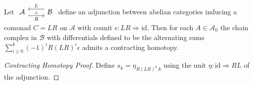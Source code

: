 \begin{lem}[label=lem:contractHomotop]
    Let $\begin{tikzcd}
{\mathcal{A}} & {\mathcal{B}}
\arrow[""{name=0, anchor=center, inner sep=0}, "R"', shift right=2, from=1-1, to=1-2]
\arrow[""{name=1, anchor=center, inner sep=0}, "L"', shift right=2, from=1-2, to=1-1]
\arrow["\dashv"{anchor=center, rotate=-90}, draw=none, from=1, to=0]
\end{tikzcd}$ define an adjunction between abelian categories inducing a comonad $C = LR$ on $\mathcal{A}$ with counit $\epsilon:LR\Rightarrow \text{id}$. Then for each $A \in \mathcal{A}_0$ the chain complex in $\mathcal{B}$ with differentials defined to be the alternating sums $\sum_{i\geq 0}^k(-1)^iR(LR)^i\epsilon$ admits a contracting homotopy.
\end{lem}
\begin{proof}[Contracting Homotopy Proof]
    Define $s_k = \eta_{R(LR)^kA}$ using the unit $\eta:\text{id}\Rightarrow RL$ of the adjunction.


\end{proof}
